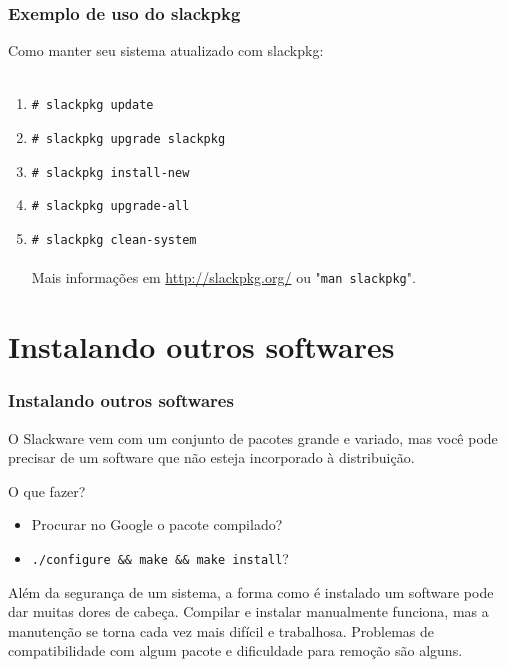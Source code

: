 \documentclass{beamer}
\begin{document}
\begin{frame}
	\frametitle{Exemplo de uso do slackpkg}
	Como manter seu sistema atualizado com slackpkg:\\
	~\\
	\begin{enumerate}
		\item \texttt{\# slackpkg update}
		\item \texttt{\# slackpkg upgrade slackpkg}
		\item \texttt{\# slackpkg install-new}
		\item \texttt{\# slackpkg upgrade-all}
		\item \texttt{\# slackpkg clean-system}
	~\\
	~\\
	Mais informações em \url{http://slackpkg.org/} ou "\texttt{man slackpkg}".
	\end{enumerate}
\end{frame}

\section{Instalando outros softwares}
\begin{frame}
	\frametitle{Instalando outros softwares}
	O Slackware vem com um conjunto de pacotes grande e variado, mas você pode
	precisar de um software que não esteja incorporado à distribuição.
	~\\
	\begin{block}{O que fazer?}
		\begin{itemize}
			\item Procurar no Google o pacote compilado?
			\item \texttt{./configure \&\& make \&\& make install}?
		\end{itemize}
	\end{block}
	Além da segurança de um sistema, a forma como é instalado um software pode dar
	muitas dores de cabeça. Compilar e instalar manualmente funciona, mas a manutenção
	se torna cada vez mais difícil e trabalhosa. Problemas de compatibilidade com
	algum pacote e dificuldade para remoção são alguns.
\end{frame}
\end{document}
